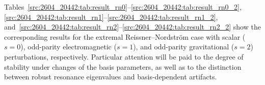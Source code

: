 \begin{table}[htbp]
\centering
\caption{Numerical results of QNM frequencies of Schwarzschild. The numbers in parentheses indicate the estimated numerical uncertainty in the last quoted digits.}
\label{src:2604_20442:tab:result_schw}
\end{table}
Tables~\ref{src:2604_20442:tab:result_rn0}--\ref{src:2604_20442:tab:result_rn0_2}, \ref{src:2604_20442:tab:result_rn1}--\ref{src:2604_20442:tab:result_rn1_2}, and~\ref{src:2604_20442:tab:result_rn2}--\ref{src:2604_20442:tab:result_rn2_2} show the corresponding results for the extremal Reissner--Nordstr\"om case with scalar ($s=0$), odd-parity electromagnetic ($s=1$), and odd-parity gravitational ($s=2$) perturbations, respectively.
Particular attention will be paid to the degree of stability under changes of the basis parameters, as well as to the distinction between robust resonance eigenvalues and basis-dependent artifacts.
